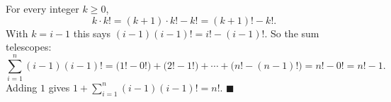 For every integer $k\ge0$,
\[k\cdot k!=(k+1)\cdot k!-k!=(k+1)!-k!.\]
With $k=i-1$ this says $(i-1)(i-1)!=i!-(i-1)!$. So the sum telescopes:
\[\sum_{i=1}^{n}(i-1)(i-1)!=\big(1!-0!\big)+\big(2!-1!\big)+\cdots+\big(n!-(n-1)!\big)=n!-0!=n!-1.\]
Adding $1$ gives $1+\displaystyle\sum_{i=1}^{n}(i-1)(i-1)!=n!$. $\blacksquare$
